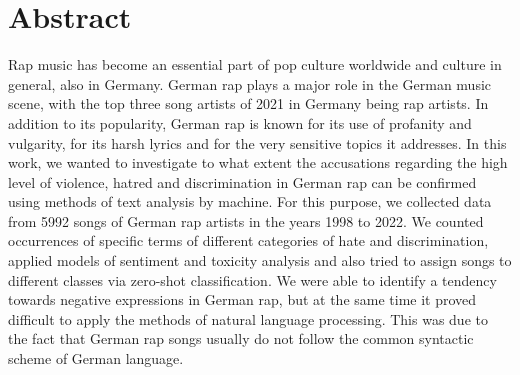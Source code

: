 \section*{Abstract}\label{sec:abstract}
Rap music has become an essential part of pop culture worldwide and culture in general, also in Germany. German rap plays a major role in the German music scene, with the top three song artists of 2021 in Germany being rap artists. In addition to its popularity, German rap is known for its use of profanity and vulgarity, for its harsh lyrics and for the very sensitive topics it addresses. In this work, we wanted to investigate to what extent the accusations regarding the high level of violence, hatred and discrimination in German rap can be confirmed using methods of text analysis by machine. For this purpose, we collected data from 5992 songs of German rap artists in the years 1998 to 2022. We counted occurrences of specific terms of different categories of hate and discrimination, applied models of sentiment and toxicity analysis and also tried to assign songs to different classes via zero-shot classification. We were able to identify a tendency towards negative expressions in German rap, but at the same time it proved difficult to apply the methods of natural language processing. This was due to the fact that German rap songs usually do not follow the common syntactic scheme of German language.